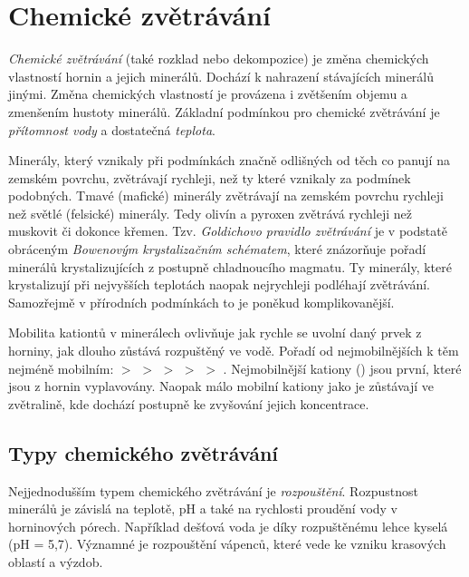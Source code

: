 \section{Chemické zvětrávání}
\emph{Chemické zvětrávání} (také rozklad nebo dekompozice) je změna chemických vlastností hornin a jejich minerálů. Dochází k nahrazení stávajících minerálů jinými. Změna chemických vlastností je provázena i zvětšením objemu a zmenšením hustoty minerálů. Základní podmínkou pro chemické zvětrávání je \emph{přítomnost vody} a dostatečná \emph{teplota}.

Minerály, který vznikaly při podmínkách značně odlišných od těch co panují na zemském povrchu, zvětrávají rychleji, než ty které vznikaly za podmínek podobných. Tmavé (mafické) minerály zvětrávají na zemském povrchu rychleji než světlé (felsické) minerály. Tedy olivín a pyroxen zvětrává rychleji než muskovit či dokonce křemen. Tzv. \emph{Goldichovo pravidlo zvětrávání} je v podstatě obráceným \emph{Bowenovým krystalizačním schématem}, které znázorňuje pořadí minerálů krystalizujících z postupně chladnoucího magmatu. Ty minerály, které krystalizují při nejvyšších teplotách naopak nejrychleji podléhají zvětrávání. Samozřejmě v přírodních podmínkách to je poněkud komplikovanější. 

Mobilita kationtů v minerálech ovlivňuje jak rychle se uvolní daný prvek z horniny, jak dlouho zůstává rozpuštěný ve vodě. Pořadí od nejmobilnějších k těm nejméně mobilním:  $>$  $>$  $>$  $>$  $>$ . Nejmobilnější kationy () jsou první, které jsou z hornin vyplavovány. Naopak málo mobilní kationy jako je  zůstávají ve zvětralině, kde dochází postupně ke zvyšování jejich koncentrace. 

\subsection{Typy chemického zvětrávání}
Nejjednodušším typem chemického zvětrávání je \emph{rozpouštění}. Rozpustnost minerálů je závislá na teplotě, pH a také na rychlosti proudění vody v horninových pórech. Například dešťová voda je díky rozpuštěnému  lehce kyselá (pH = 5,7). Významné je rozpouštění vápenců, které vede ke vzniku krasových oblastí a výzdob. 
%

